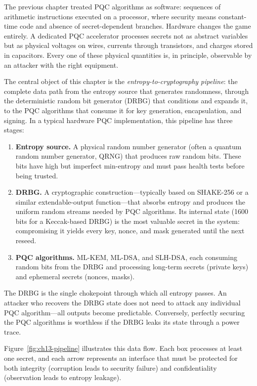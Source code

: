 The previous chapter treated PQC algorithms as software: sequences of arithmetic instructions executed on a processor, where security means constant-time code and absence of secret-dependent branches.  Hardware changes the game entirely.  A dedicated PQC accelerator processes secrets not as abstract variables but as physical voltages on wires, currents through transistors, and charges stored in capacitors.  Every one of these physical quantities is, in principle, observable by an attacker with the right equipment.

The central object of this chapter is the \emph{entropy-to-cryptography pipeline}: the complete data path from the entropy source that generates randomness, through the deterministic random bit generator (DRBG) that conditions and expands it, to the PQC algorithms that consume it for key generation, encapsulation, and signing.  In a typical hardware PQC implementation, this pipeline has three stages:

\begin{enumerate}
\item \textbf{Entropy source.}  A physical random number generator (often a quantum random number generator, QRNG) that produces raw random bits.  These bits have high but imperfect min-entropy and must pass health tests before being trusted.
\item \textbf{DRBG.}  A cryptographic construction---typically based on SHAKE-256 or a similar extendable-output function---that absorbs entropy and produces the uniform random streams needed by PQC algorithms.  Its internal state (1600 bits for a Keccak-based DRBG) is the most valuable secret in the system: compromising it yields every key, nonce, and mask generated until the next reseed.
\item \textbf{PQC algorithms.}  ML-KEM, ML-DSA, and SLH-DSA, each consuming random bits from the DRBG and processing long-term secrets (private keys) and ephemeral secrets (nonces, masks).
\end{enumerate}

The DRBG is the single chokepoint through which all entropy passes.  An attacker who recovers the DRBG state does not need to attack any individual PQC algorithm---all outputs become predictable.  Conversely, perfectly securing the PQC algorithms is worthless if the DRBG leaks its state through a power trace.

Figure~\ref{fig:ch13-pipeline} illustrates this data flow.  Each box processes at least one secret, and each arrow represents an interface that must be protected for both integrity (corruption leads to security failure) and confidentiality (observation leads to entropy leakage).

